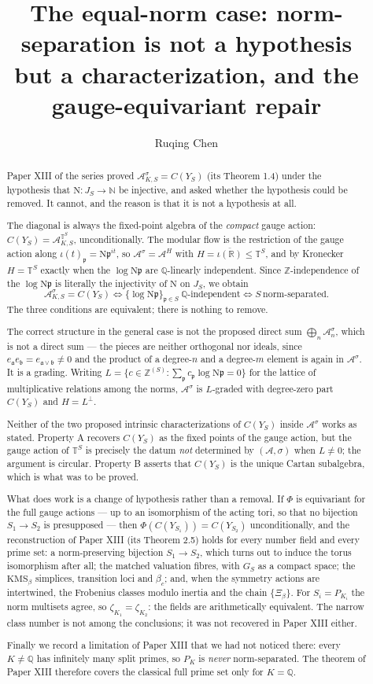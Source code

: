 \documentclass[11pt]{amsart}
\title[The equal-norm case]{The equal-norm case: norm-separation is not a hypothesis\\ but a characterization, and the gauge-equivariant repair}
\author{Ruqing Chen}
\date{}
\numberwithin{equation}{section}
\theoremstyle{definition}
\theoremstyle{remark}
\newcommand{\Z}{\mathbb{Z}}
\newcommand{\Q}{\mathbb{Q}}
\newcommand{\R}{\mathbb{R}}
\newcommand{\N}{\mathbb{N}}
\newcommand{\T}{\mathbb{T}}
\newcommand{\cA}{\mathcal{A}}
\newcommand{\pp}{\mathfrak{p}}
\newcommand{\aaa}{\mathfrak{a}}
\newcommand{\bb}{\mathfrak{b}}
\newcommand{\Ns}{\mathrm{N}}
\begin{document}
\begin{abstract}
Paper XIII of the series proved $\cA_{K,S}^\sigma=C(Y_S)$ (its Theorem 1.4) under the
hypothesis that $\Ns:J_S\to\N$ be injective, and asked whether the hypothesis could be
removed. It cannot, and the reason is that it is not a hypothesis at all.

The diagonal is always the fixed-point algebra of the \emph{compact} gauge action:
$C(Y_S)=\cA_{K,S}^{\T^S}$, unconditionally. The modular flow is the restriction of the gauge
action along $\iota(t)_\pp=\Ns\pp^{it}$, so $\cA^\sigma=\cA^{H}$ with
$H=\overline{\iota(\R)}\le\T^S$, and by Kronecker $H=\T^S$ exactly when the $\log\Ns\pp$ are
$\Q$-linearly independent. Since $\Z$-independence of the $\log\Ns\pp$ is literally the
injectivity of $\Ns$ on $J_S$, we obtain
\[
\cA_{K,S}^\sigma=C(Y_S)
\iff \{\log\Ns\pp\}_{\pp\in S}\ \Q\text{-independent}
\iff S\ \text{norm-separated}.
\]
The three conditions are equivalent; there is nothing to remove.

The correct structure in the general case is not the proposed direct sum
$\bigoplus_n\cA^\sigma_n$, which is not a direct sum --- the pieces are neither orthogonal
nor ideals, since $e_\aaa e_\bb=e_{\aaa\vee\bb}\ne0$ and the product of a degree-$n$ and a
degree-$m$ element is again in $\cA^\sigma$. It is a grading. Writing
$L=\{c\in\Z^{(S)}:\sum_\pp c_\pp\log\Ns\pp=0\}$ for the lattice of multiplicative relations
among the norms, $\cA^\sigma$ is $L$-graded with degree-zero part $C(Y_S)$ and
$H=L^\perp$.

Neither of the two proposed intrinsic characterizations of $C(Y_S)$ inside $\cA^\sigma$
works as stated. Property A recovers $C(Y_S)$ as the fixed points of the gauge action, but
the gauge action of $\T^S$ is precisely the datum \emph{not} determined by $(\cA,\sigma)$
when $L\ne0$; the argument is circular. Property B asserts that $C(Y_S)$ is the unique Cartan
subalgebra, which is what was to be proved.

What does work is a change of hypothesis rather than a removal. If $\Phi$ is equivariant for
the full gauge actions --- up to an isomorphism of the acting tori, so that no bijection
$S_1\to S_2$ is presupposed --- then $\Phi(C(Y_{S_1}))=C(Y_{S_2})$ unconditionally, and the
reconstruction of Paper XIII (its Theorem 2.5) holds for every number field and every prime
set: a norm-preserving bijection $S_1\to S_2$, which turns out to induce the torus
isomorphism after all; the matched valuation fibres, with $G_S$ as a compact space; the
$\mathrm{KMS}_\beta$ simplices, transition loci and $\beta_c$; and, when the symmetry actions
are intertwined, the Frobenius classes modulo inertia and the chain $\{\Xi_\beta\}$. For
$S_i=P_{K_i}$ the norm multisets agree, so $\zeta_{K_1}=\zeta_{K_2}$: the fields are
arithmetically equivalent. The narrow class number is not among the conclusions; it was not
recovered in Paper XIII either.

Finally we record a limitation of Paper XIII that we had not noticed there: every $K\ne\Q$
has infinitely many split primes, so $P_K$ is \emph{never} norm-separated. The theorem of
Paper XIII therefore covers the classical full prime set only for $K=\Q$.
\end{abstract}
\end{document}
